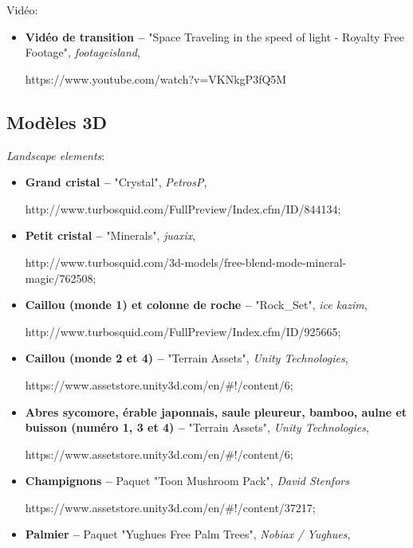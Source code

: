 	Vidéo:
	\begin{itemize}
		\item \textbf{Vidéo de transition --} "Space Traveling in the speed of light - Royalty Free Footage", \textit{footageisland}, 
		
		https://www.youtube.com/watch?v=VKNkgP3fQ5M
	\end{itemize}

\subsection*{Modèles 3D}

	\textit{Landscape elements}:
	\begin{itemize}
		
		\item \textbf{Grand cristal --} "Crystal", \textit{PetrosP}, 
		
		http://www.turbosquid.com/FullPreview/Index.cfm/ID/844134;
		
		\item \textbf{Petit cristal --} "Minerals", \textit{juaxix}, 
		
		http://www.turbosquid.com/3d-models/free-blend-mode-mineral-magic/762508;
			
		\item \textbf{Caillou (monde 1) et colonne de roche --} "Rock\_Set", \textit{ice kazim}, 
		
		http://www.turbosquid.com/FullPreview/Index.cfm/ID/925665;
		
		\item \textbf{Caillou (monde 2 et 4) --} "Terrain Assets", \textit{Unity Technologies}, 
		
		https://www.assetstore.unity3d.com/en/\#!/content/6;
		
		\item \textbf{Abres sycomore, érable japonnais, saule pleureur, bamboo, aulne et buisson (numéro 1, 3 et 4) --} "Terrain Assets", \textit{Unity Technologies}, 
		
		https://www.assetstore.unity3d.com/en/\#!/content/6;
		
		\item \textbf{Champignons --} Paquet "Toon Mushroom Pack", \textit{David Stenfors} 
		
		https://www.assetstore.unity3d.com/en/\#!/content/37217;
				
		\item \textbf{Palmier --} Paquet "Yughues Free Palm Trees", \textit{Nobiax / Yughues}, 
		

\end{itemize}
